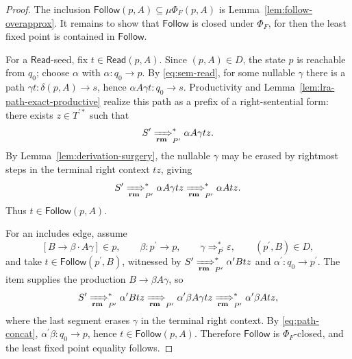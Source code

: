 \documentclass[11pt,a4paper]{article}
\theoremstyle{prettyplain}
\theoremstyle{prettydef}
\newcommand{\eps}{\varepsilon}
\newcommand{\RMP}{\xRightarrow[\mathbf{rm}]{}_{P^\prime}}
\newcommand{\Path}[3]{#1:#2\to#3}
\newcommand{\Item}[2]{[#1\to #2]}
\begin{document}
\begin{proof}
The inclusion \(\mathsf{Follow}(p,A)\subseteq\mu\Phi_F(p,A)\) is
Lemma~\ref{lem:follow-overapprox}.  It remains to show that
\(\mathsf{Follow}\) is closed under \(\Phi_F\), for then the least fixed point is
contained in \(\mathsf{Follow}\).

For a \(\mathsf{Read}\)-seed, fix \(t\in\mathsf{Read}(p,A)\).  Since
\((p,A)\in D\), the state \(p\) is reachable from \(q_0\); choose
\(\alpha\) with \(\Path{\alpha}{q_0}{p}\).  By \eqref{eq:sem-read}, for some
nullable \(\gamma\) there is a path
\(\Path{\gamma t}{\delta(p,A)}{s}\), hence
\(\Path{\alpha A\gamma t}{q_0}{s}\).  Productivity and
Lemma~\ref{lem:lra-path-exact-productive} realize this path as a prefix of a
right-sentential form: there exists \(z\in T^{\prime *}\) such that
\[
S^\prime\RMP^*\alpha A\gamma t z .
\]
By Lemma~\ref{lem:derivation-surgery}, the nullable \(\gamma\) may be erased by
rightmost steps in the terminal right context \(t z\), giving
\[
S^\prime\RMP^*\alpha A\gamma t z
\RMP^*
\alpha A t z .
\]
Thus \(t\in\mathsf{Follow}(p,A)\).

For an includes edge, assume
\[
\Item{B}{\beta\cdot A\gamma}\in p,
\qquad
\Path{\beta}{p^\prime}{p},
\qquad
\gamma\Rightarrow_{P^\prime}^*\eps,
\qquad
(p^\prime,B)\in D,
\]
and take \(t\in\mathsf{Follow}(p^\prime,B)\), witnessed by
\(S^\prime\RMP^*\alpha^\prime B t z\) and
\(\Path{\alpha^\prime}{q_0}{p^\prime}\).  The item supplies the production
\(B\to\beta A\gamma\), so
\[
S^\prime\RMP^*\alpha^\prime B t z
\RMP
\alpha^\prime\beta A\gamma t z
\RMP^*
\alpha^\prime\beta A t z,
\]
where the last segment erases \(\gamma\) in the terminal right context.  By
\eqref{eq:path-concat}, \(\Path{\alpha^\prime\beta}{q_0}{p}\), hence
\(t\in\mathsf{Follow}(p,A)\).  Therefore
\(\mathsf{Follow}\) is \(\Phi_F\)-closed, and the least fixed point equality
follows.
\end{proof}
\end{document}
